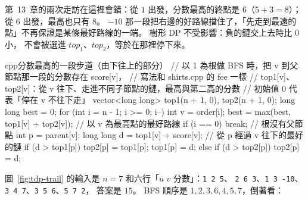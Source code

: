 \begin{center}
\label{fig:tdp-trail}
\end{center}

第~13~章的兩次走訪在這裡會錯：從 $1$ 出發，分數最高的終點是 $6$（$5 + 3 = 8$）；
從 $6$ 出發，最高也只有 $8$。 $-10$ 那一段把右邊的好路線擋住了，「先走到最遠的
點」不再保證是某條最好路線的一端。 樹形 DP 不受影響：負的鏈交上去時比 $0$ 小，
不會被選進 $\mathit{top}_1$、$\mathit{top}_2$，等於在那裡停下來。

\begin{code}{cpp}{分數最高的一段步道（由下往上的部分）}
// 以 1 為根做 BFS 時，把 v 到父節點那一段的分數存在 score[v]，
// 寫法和 shirts.cpp 的 fee 一樣
// top1[v]、top2[v]：從 v 往下、走進不同子節點的鏈，最高與第二高的分數
// 初始值 0 代表「停在 v 不往下走」
vector<long long> top1(n + 1, 0), top2(n + 1, 0);
long long best = 0;
for (int i = n - 1; i >= 0; i--) {
    int v = order[i];
    best = max(best, top1[v] + top2[v]);    // 以 v 為最高點的最好路線
    if (i == 0) {
        break;                              // 根沒有父節點
    }
    int p = parent[v];
    long long d = top1[v] + score[v];       // 從 p 經過 v 往下的最好的鏈
    if (d > top1[p]) {
        top2[p] = top1[p];
        top1[p] = d;
    } else if (d > top2[p]) {
        top2[p] = d;
    }
}
\end{code}

圖~\ref{fig:tdp-trail} 的輸入是 $n = 7$ 和六行「$u$ $v$ 分數」：\texttt{1 2 5}、
\texttt{2 6 3}、\texttt{1 3 -10}、\texttt{3 4 7}、\texttt{3 5 6}、\texttt{5 7 2}，
答案是 $15$。 BFS 順序是 $1, 2, 3, 6, 4, 5, 7$，倒著看：

